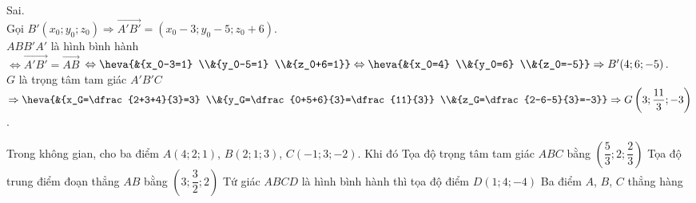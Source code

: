\begin{ex}
{\begin{itemchoice}
		\itemch Sai.\\ 
		Gọi $B'\left(x_0; y_0; z_0\right)\Rightarrow  \overrightarrow{A'B'}=\left(x_0-3; y_0-5; z_0+6\right)$.\\
		$ABB'A'$ là  hình bình hành\\
		$\Leftrightarrow  \overrightarrow{A'B'}=\overrightarrow{AB}$ $\Leftrightarrow \heva{&{x_0-3=1} \\&{y_0-5=1} \\&{z_0+6=1}} \Leftrightarrow \heva{&{x_0=4} \\&{y_0=6} \\&{z_0=-5}} \Rightarrow B'(4; 6;-5)$.\\
		$G$ là trọng tâm tam giác $A'B'C$ $\Rightarrow \heva{&{x_G=\dfrac{2+3+4}{3}=3} \\&{y_G=\dfrac{0+5+6}{3}=\dfrac{11}{3}} \\&{z_G=\dfrac{2-6-5}{3}=-3}} \Rightarrow G\left(3;  \dfrac{11}{3};-3\right)$.
	\end{itemchoice}
 }
\end{ex}

\begin{ex}%
	Trong không gian,  cho ba điểm $A(4;2;1)$, $B(2;1;3)$, $C(-1;3;-2)$. Khi đó
	\choiceTF 
		{\True Tọa độ trọng tâm tam giác $ABC$  bằng $\left( \dfrac{5}{3};2;\dfrac{2}{3}\right)$}
		{\True Tọa độ trung  điểm đoạn thẳng $AB$ bằng $\left(3;\dfrac{3}{2};2\right)$}
		{\True Tứ giác $ABCD$ là  hình bình hành thì tọa độ điểm $D \left(1;4;-4\right)$}
		{Ba điểm $A$, $B$,  $C$ thẳng hàng}
\end{ex}

